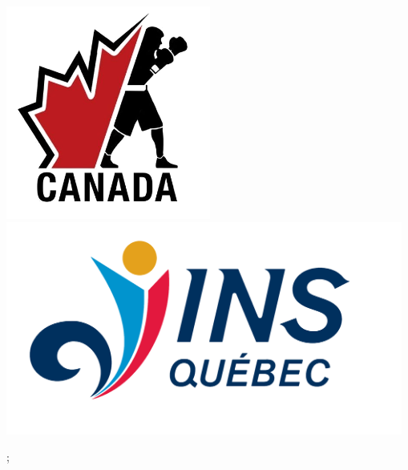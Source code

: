 \documentclass[25pt, a0paper, landscape]{tikzposter}
\begin{document}
{\begin{minipage}[c][][c]{0.23\linewidth}
    \hspace*{-10pt} %
    \includegraphics[height=7cm]{figures/image5.png}%
    \hspace*{-10pt} %
    \includegraphics[height=7cm]{figures/image9.png}
\end{minipage}

};
\end{document}
